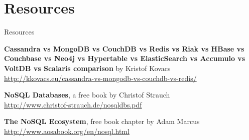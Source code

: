 \documentclass{beamer}
\begin{document}
\section{Resources}

\begin{frame}{Resources}

\textbf{Cassandra vs MongoDB vs CouchDB vs Redis vs Riak vs HBase vs
  Couchbase vs Neo4j vs Hypertable vs ElasticSearch vs Accumulo vs
  VoltDB vs Scalaris comparison} by Kristof Kovacs \\
\url{http://kkovacs.eu/cassandra-vs-mongodb-vs-couchdb-vs-redis/}

\vskip 0.15in

\textbf{NoSQL Databases}, a free book by Christof Strauch \\
\url{http://www.christof-strauch.de/nosqldbs.pdf}

\vskip 0.15in

\textbf{The NoSQL Ecosystem}, free book chapter by Adam Marcus \\
\url{http://www.aosabook.org/en/nosql.html}

\end{frame}
\end{document}
